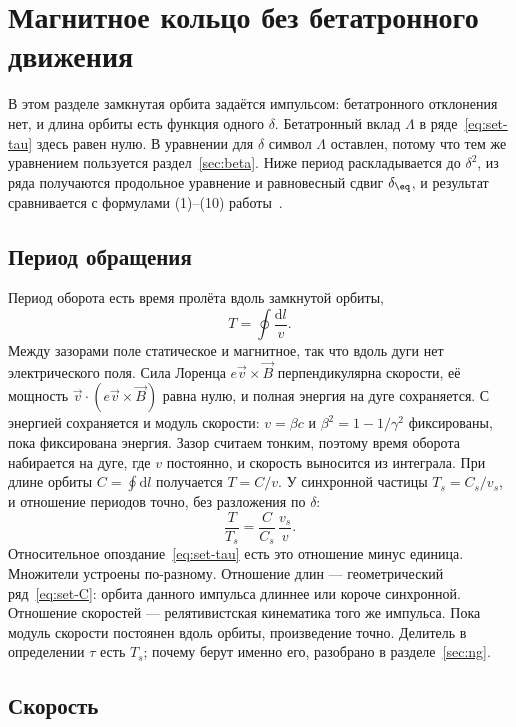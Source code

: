 \section{Магнитное кольцо без бетатронного движения}
\label{sec:mag}

В этом разделе замкнутая орбита задаётся импульсом: бетатронного отклонения нет, и длина орбиты есть функция одного $\delta$. Бетатронный вклад $\Lambda$ в ряде~\eqref{eq:set-tau} здесь равен нулю. В уравнении для $\delta$ символ $\Lambda$ оставлен, потому что тем же уравнением пользуется раздел~\ref{sec:beta}. Ниже период раскладывается до $\delta^2$, из ряда получаются продольное уравнение и равновесный сдвиг $\delta_\eq$, и результат сравнивается с формулами (1)--(10) работы~\cite{Senichev2013}.

\subsection{Период обращения}

Период оборота есть время пролёта вдоль замкнутой орбиты,
\begin{equation}
\label{eq:mag-T}
T=\oint\frac{\mathrm{d}l}{v}.
\end{equation}
Между зазорами поле статическое и магнитное, так что вдоль дуги нет электрического поля. Сила Лоренца $e\vec{v}\times\vec{B}$ перпендикулярна скорости, её мощность $\vec{v}\cdot(e\vec{v}\times\vec{B})$ равна нулю, и полная энергия на дуге сохраняется. С энергией сохраняется и модуль скорости: $v=\beta c$ и $\beta^2=1-1/\gamma^2$ фиксированы, пока фиксирована энергия. Зазор считаем тонким, поэтому время оборота набирается на дуге, где $v$ постоянно, и скорость выносится из интеграла. При длине орбиты $C=\oint\mathrm{d}l$ получается $T=C/v$. У синхронной частицы $T_s=C_s/v_s$, и отношение периодов точно, без разложения по $\delta$:
\begin{equation}
\label{eq:mag-Tratio}
\frac{T}{T_s}=\frac{C}{C_s}\,\frac{v_s}{v}.
\end{equation}
Относительное опоздание~\eqref{eq:set-tau} есть это отношение минус единица. Множители устроены по-разному. Отношение длин --- геометрический ряд~\eqref{eq:set-C}: орбита данного импульса длиннее или короче синхронной. Отношение скоростей --- релятивистская кинематика того же импульса. Пока модуль скорости постоянен вдоль орбиты, произведение точно. Делитель в определении $\tau$ есть $T_s$; почему берут именно его, разобрано в разделе~\ref{sec:ng}.

\subsection{Скорость}

